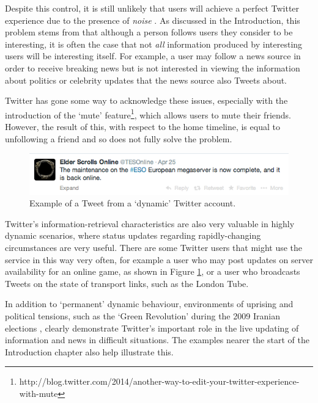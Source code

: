 Despite this control, it is still unlikely that users will achieve a perfect Twitter experience due to the presence of \textit{noise} \cite{alonso10}. As discussed in the Introduction, this problem stems from that although a person follows users they consider to be interesting, it is often the case that not \textit{all} information produced by interesting users will be interesting itself. For example, a user may follow a news source in order to receive breaking news but is not interested in viewing the information about politics or celebrity updates that the news source also Tweets about.

Twitter has gone some way to acknowledge these issues, especially with the introduction of the `mute' feature\footnote{http://blog.twitter.com/2014/another-way-to-edit-your-twitter-experience-with-mute}, which allows users to mute their friends. However, the result of this, with respect to the home timeline, is equal to unfollowing a friend and so does not fully solve the problem.


\begin{figure}[h]
\centering
\includegraphics[scale=0.75]{2.Background/Media/eso.png} 
\caption{Example of a Tweet from a `dynamic' Twitter account.}
\label{fig:eso}
\end{figure}

Twitter's information-retrieval characteristics are also very valuable in highly dynamic scenarios, where status updates regarding rapidly-changing circumstances are very useful. There are some Twitter users that might use the service in this way very often, for example a user who may post updates on server availability for an online game, as shown in Figure \ref{fig:eso}, or a user who broadcasts Tweets on the state of transport links, such as the London Tube.

In addition to `permanent' dynamic behaviour, environments of uprising and political tensions, such as the `Green Revolution' during the 2009 Iranian elections \cite{burns09}, clearly demonstrate Twitter's important role in the live updating of information and news in difficult situations. The examples nearer the start of the Introduction chapter also help illustrate this.



